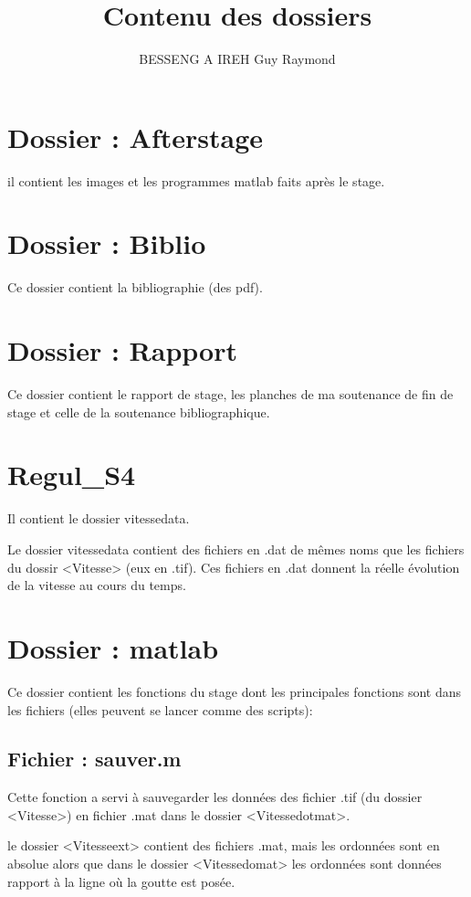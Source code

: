 \documentclass{article}
\author{BESSENG A IREH Guy Raymond}
\title{Contenu des dossiers}
\date{}
\begin{document}
\maketitle

\section{Dossier : Afterstage}
il contient les images et les programmes matlab faits après le stage.

\section{Dossier : Biblio}
Ce dossier contient la bibliographie (des pdf).

\section{Dossier : Rapport}
Ce dossier contient le rapport de stage, les planches de ma soutenance de fin de stage et celle de la soutenance bibliographique.

\section{Regul\_S4}

Il contient le dossier vitessedata.


Le dossier vitessedata contient des fichiers en .dat de mêmes noms que les fichiers du dossir <Vitesse> (eux en .tif).
Ces fichiers en .dat donnent la réelle évolution de la vitesse au cours du temps.

\section{Dossier : matlab}

Ce dossier contient les fonctions du stage dont les principales fonctions sont dans les fichiers (elles peuvent se lancer comme des scripts):
\subsection{Fichier : sauver.m}

Cette fonction a servi à sauvegarder les données des fichier .tif (du dossier <Vitesse>) en fichier .mat dans le dossier <Vitessedotmat>.

le dossier <Vitesseext> contient des fichiers .mat, mais les ordonnées sont 
en absolue alors que dans le dossier <Vitessedomat> les ordonnées sont données rapport à la ligne où la goutte est posée. 
\end{document}

